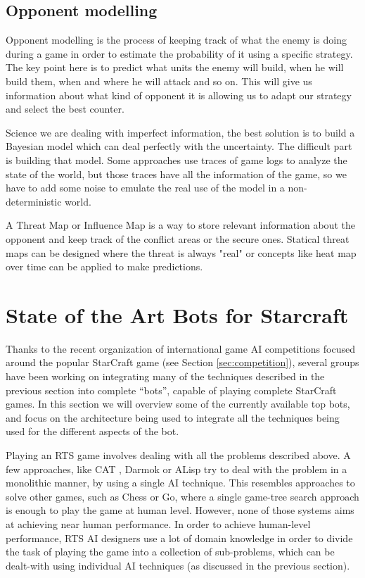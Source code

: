 \documentclass[journal]{IEEEtran}
\begin{document}
\subsection{Opponent modelling}
{\color{ForestGreen}
Opponent modelling is the process of keeping track of what the enemy is doing during a game in order to estimate the probability of it using a specific strategy. The key point here is to predict what units the enemy will build, when he will build them, when and where he will attack and so on. This will give us information about what kind of opponent it is allowing us to adapt our strategy and select the best counter.

Science we are dealing with imperfect information, the best solution is to build a Bayesian model which can deal perfectly with the uncertainty. The difficult part is building that model. Some approaches use traces of game logs to analyze the state of the world, but those traces have all the information of the game, so we have to add some noise to emulate the real use of the model in a non-deterministic world.

A Threat Map or Influence Map is a way to store relevant information about the opponent and keep track of the conflict areas or the secure ones. Statical threat maps can be designed where the threat is always "real" or concepts like heat map over time can be applied to make predictions.
}


\section{State of the Art Bots for Starcraft}\label{sec:bot}

Thanks to the recent organization of international game AI competitions focused around the popular StarCraft game (see Section \ref{sec:competition}), several groups have been working on integrating many of the techniques described in the previous section into complete ``bots'', capable of playing complete StarCraft games. In this section we will overview some of the currently available top bots, and focus on the architecture being used to integrate all the techniques being used for the different aspects of the bot.

Playing an RTS game involves dealing with all the problems described above. A few approaches, like CAT \cite{LTW}, Darmok \cite{OntanonMSR10} or ALisp \cite{Marthi05} try to deal with the problem in a monolithic manner, by using a single AI technique. This resembles approaches to solve other games, such as Chess or Go, where a single game-tree search approach is enough to play the game at human level. However, none of those systems aims at achieving near human performance. In order to achieve human-level performance, RTS AI designers use a lot of domain knowledge in order to divide the task of playing the game into a collection of sub-problems, which can be dealt-with using individual AI techniques (as discussed in the previous section). 
\end{document}
